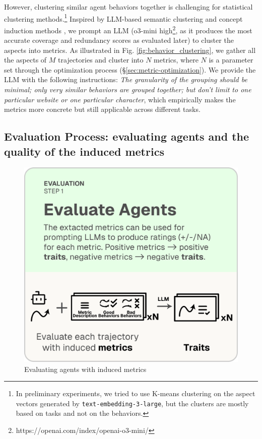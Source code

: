 However, clustering similar agent behaviors together is challenging for statistical clustering methods.\footnote{
    In preliminary experiments, we tried to use K-means clustering on the aspect vectors generated by \texttt{text-embedding-3-large},
    but the clusters are mostly based on tasks and not on the behaviors.
}
Inspired by LLM-based semantic clustering and concept induction methods \citet{viswanathan2024large,lam2024concept}, we prompt an LLM (o3-mini high\footnote{https://openai.com/index/openai-o3-mini/}, as it produces the most accurate coverage and redundancy scores as evaluated later) 
to cluster the aspects into metrics. 
As illustrated in Fig. \ref{fig:behavior_clustering},
we gather all the aspects of $M$ trajectories
and cluster into $N$ metrics, where $N$ is a parameter set through the optimization process (\S\ref{sec:metric-optimization}).
We provide the LLM with the following instructions:
\emph{The granularity of the grouping should be minimal; only very similar behaviors are grouped together; but don't limit to one particular website or one particular character}, which empirically
makes the metrics more concrete but still applicable across different tasks.


\subsection{Evaluation Process: evaluating agents and the quality of the induced metrics}
\label{sec:evaluation_process}
\begin{figure}
  \vspace{-15pt}
  \includegraphics[width=\linewidth]{figs/autolibra_step_3.pdf}
  \vspace{-10pt}
  \caption{\small Evaluating agents with induced metrics}
  \label{fig:llm_as_a_judge}
\end{figure}
